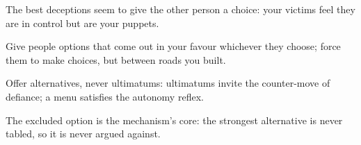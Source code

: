 

\begin{distilled}
  \item The best deceptions seem to give the other person a choice: your victims feel they are in control but are your puppets.
  \item Give people options that come out in your favour whichever they choose; force them to make choices, but between roads you built.
  \item Offer alternatives, never ultimatums: ultimatums invite the counter-move of defiance; a menu satisfies the autonomy reflex.
  \item The excluded option is the mechanism's core: the strongest alternative is never tabled, so it is never argued against.
\end{distilled}
